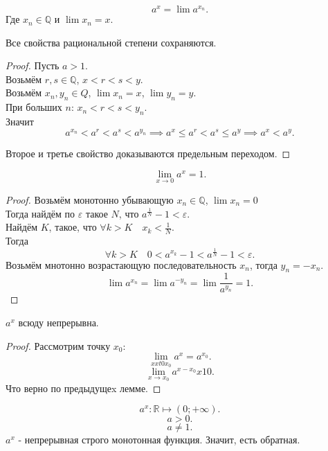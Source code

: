 \documentclass[11pt, oneside]{article}   	%
\begin{document}
    \begin{definition}
        \[ a^{x} = \lim a^{x_n} .\]
        Где $x_n\in \mathbb{Q}$ и $\lim x_n = x$.
    \end{definition}
    \begin{dlemma}
        Все свойства рациональной степени сохраняются.
        \begin{proof}
            Пусть $a>1$.\\
            Возьмём $r,s\in \mathbb{Q}$, $x < r < s < y$.\\
            Возьмём $x_n, y_n\in Q$, $\lim x_n = x$, $\lim y_n = y$.\\
            При больших $n$: $x_n < r < s < y_n$.\\
            Значит 
            \[ a^{x_n} < a^{r} < a^{s} < a^{y_n} \implies a^{x} \le a^{r} < a^{s} \le a^{y} \implies a^{x} < a^{y}.\] 

            Второе и третье свойство доказываются предельным переходом.
        \end{proof}
    \end{dlemma}
    \begin{dlemma}
        \[ \lim\limits_{x \to 0} a^{x} = 1 .\]
        \begin{proof}
            Возьмём монотонно убывающую $x_n\in \mathbb{Q}$, $\lim x_n = 0$\\
            Тогда найдём по $\varepsilon$ такое $N$, что $a^{\frac{1}{N}} - 1 < \varepsilon$.\\
            Найдём $K$, такое, что $\forall{k > K}\quad x_k < \frac{1}{N}$.\\
            Тогда
            \[ \forall{k > K}\quad 0 < a^{x_k} - 1 < a^{\frac{1}{N}} - 1 < \varepsilon .\]
            Возьмём мнотонно возрастающую последовательность $x_n$, тогда $y_n = -x_n$.\\
            \[ \lim a^{x_n} = \lim a^{-y_n} = \lim \frac{1}{a^{y_n}} = 1.\]
        \end{proof}
    \end{dlemma}
    \begin{theorem}
        $a^{x}$ всюду непрерывна.\\
        \begin{proof}
            Рассмотрим точку $x_0$:
            \[ \lim\limits_{x xt0 x_0} a^{x}=a^{x_0}  .\]
            \[ \lim\limits_{x \to x_0} a^{x-x_0}x10.\]
            Что верно по предыдущеx лемме.
        \end{proof}
    \end{theorem}
    \[ a^{x} : \mathbb{R} \mapsto \left( 0; +\infty \right)  .\]
    \[ a > 0 .\]
    \[ a \neq 1 .\]
    $a^{x}$ - непрерывная строго монотонная функция. Значит, есть обратная.
\end{document}
